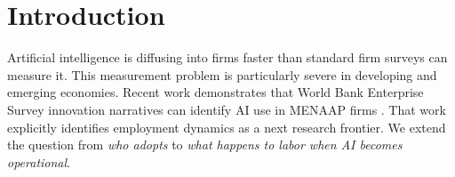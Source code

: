 \section{Introduction}
Artificial intelligence is diffusing into firms faster than standard firm surveys can measure it. This measurement problem is particularly severe in developing and emerging economies. Recent work demonstrates that World Bank Enterprise Survey innovation narratives can identify AI use in MENAAP firms \citep{udomsaph2026}. That work explicitly identifies employment dynamics as a next research frontier. We extend the question from \emph{who adopts} to \emph{what happens to labor when AI becomes operational}.
